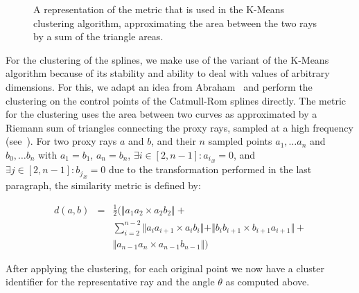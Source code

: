 \begin{figure}
\centering
{}
\caption{A representation of the metric that is used in the K-Means clustering algorithm, approximating the area between the two rays by a sum of the triangle areas.}
\label{contributions:fem:metric}
\end{figure}

For the clustering of the splines, we make use of the variant of the K-Means~\cite{hartigan75kmeans} algorithm because of its stability and ability to deal with values of arbitrary dimensions.  For this, we adapt an idea from Abraham~\etal \cite{abraham03clustering} and perform the clustering on the control points of the Catmull-Rom splines directly.  The metric for the clustering uses the area between two curves as approximated by a Riemann sum of triangles connecting the proxy rays, sampled at a high frequency (see~).  For two proxy rays $a$ and $b$, and their $n$ sampled points $a_1, \dots a_n$ and $b_0, \dots b_n$ with $a_1 = b_1$, $a_n = b_n$, $\exists i\in[2, n-1] : a{_i}_x = 0$, and $\exists j\in[2, n-1] : b{_j}_x = 0$ due to the transformation performed in the last paragraph, the similarity metric is defined by:

\begin{eqnarray}
d(a,b) &=& \frac{1}{2} \Big( \Vert a_1a_2 \times a_2b_2\Vert + \nonumber \\
&& \sum_{i=2}^{n-2}\Vert a_ia_{i+1} \times a_ib_i \Vert + \Vert b_ib_{i+1} \times b_{i+1}a_{i+1}\Vert + \\
&& \Vert a_{n-1}a_n \times a_{n-1}b_{n-1}\Vert \Big) \nonumber 
\end{eqnarray}

After applying the clustering, for each original point we now have a cluster identifier for the representative ray and the angle $\theta$ as computed above.



